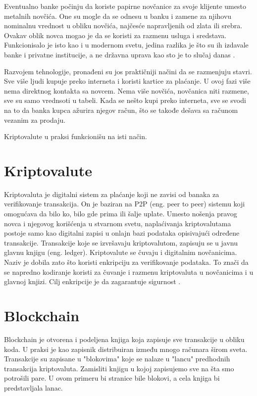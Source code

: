 \documentclass[a4paper]{article}
\begin{document}
{Eventualno banke počinju da koriste papirne novčanice za svoje klijente umesto metalnih novčića.  One su mogle da se odnesu u banku i zamene za njihovu nominalnu vrednost u obliku novčića, najčesće napravljenih od zlata ili srebra. Ovakav oblik novca mogao je da se koristi za razmenu usluga i sredstava. Funkcionisalo je isto kao i u modernom svetu, jedina razlika je što su ih izdavale banke i privatne institucije, a ne državna uprava kao sto je to slučaj danas \cite{istorijanovca}.

Razvojem tehnologije, pronađeni su jos praktičniji načini da se razmenjuju stavri. Sve više ljudi kupuje preko interneta i koristi kartice za plaćanje. U ovoj fazi više nema direktnog kontakta sa novcem. Nema više novčića, novčanica niti razmene, sve su samo vrednsoti u tabeli. Kada se nešto kupi preko interneta, sve se svodi na to da banka kupca ažurira njegov račun, što se takođe dešava sa računom vezanim za prodaju.

Kriptovalute u praksi funkcionišu na isti način.

\section{Kriptovalute}
\label{sec:kriptovalute}
Kriptovaluta je digitalni sistem za plaćanje koji ne zavisi od banaka za verifikovanje transakcija. On je baziran na P2P (eng. peer to peer) sistemu koji omogućava da bilo ko, bilo gde prima ili šalje uplate. Umesto nošenja pravog novca i njegovog korišćenja u stvarnom svetu, naplaćivanja kriptovalutama postoje samo kao digitalni zapisi u onlajn bazi podataka opisivajući određene transakcije. Transakcije koje se izvršavaju kriptovalutom, zapisuju se u javnu glavnu knjigu (eng. ledger). Kriptovalute se čuvaju i digitalnim novčanicima.
Naziv je dobila zato što koristi enkripciju za verifikovanje podataka. To znači da se napredno kodiranje koristi za čuvanje i razmenu kriptovaluta u novčanicima i u glavnoj knjizi. Cilj enkripcije je da zagarantuje sigurnost \cite{kriptovalute1}.

\newpage

\section{Blockchain}
\label{sec:blockchain}
Blockchain je otvorena i podeljena knjiga koja zapisuje sve transakcije u obliku koda. U praksi je kao zapisnik distribuiran između mnogo računara širom sveta. Transakcije su zapisane u "blokovima" koje se nalaze u "lancu" predhodnih transakcija kriptovaluta. Zamisliti knjigu u kojoj zapisujemo sve na šta smo potrošili pare. U ovom primeru bi stranice bile blokovi, a cela knjiga bi predstavljala lanac.

}
\end{document}
